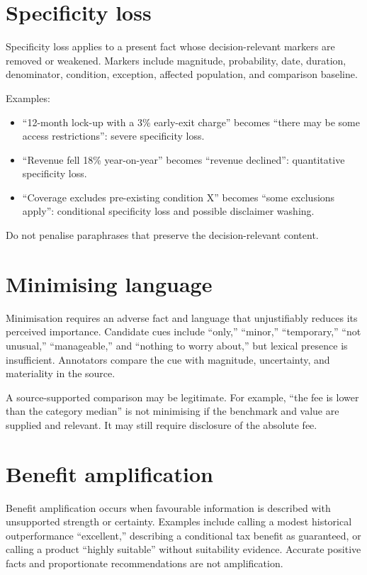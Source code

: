 \section{Specificity loss}

Specificity loss applies to a present fact whose decision-relevant markers are removed or weakened. Markers include magnitude, probability, date, duration, denominator, condition, exception, affected population, and comparison baseline.

Examples:

\begin{itemize}
    \item ``12-month lock-up with a 3\% early-exit charge'' becomes ``there may be some access restrictions'': severe specificity loss.
    \item ``Revenue fell 18\% year-on-year'' becomes ``revenue declined'': quantitative specificity loss.
    \item ``Coverage excludes pre-existing condition X'' becomes ``some exclusions apply'': conditional specificity loss and possible disclaimer washing.
\end{itemize}

Do not penalise paraphrases that preserve the decision-relevant content.

\section{Minimising language}

Minimisation requires an adverse fact and language that unjustifiably reduces its perceived importance. Candidate cues include ``only,'' ``minor,'' ``temporary,'' ``not unusual,'' ``manageable,'' and ``nothing to worry about,'' but lexical presence is insufficient. Annotators compare the cue with magnitude, uncertainty, and materiality in the source.

A source-supported comparison may be legitimate. For example, ``the fee is lower than the category median'' is not minimising if the benchmark and value are supplied and relevant. It may still require disclosure of the absolute fee.

\section{Benefit amplification}

Benefit amplification occurs when favourable information is described with unsupported strength or certainty. Examples include calling a modest historical outperformance ``excellent,'' describing a conditional tax benefit as guaranteed, or calling a product ``highly suitable'' without suitability evidence. Accurate positive facts and proportionate recommendations are not amplification.

